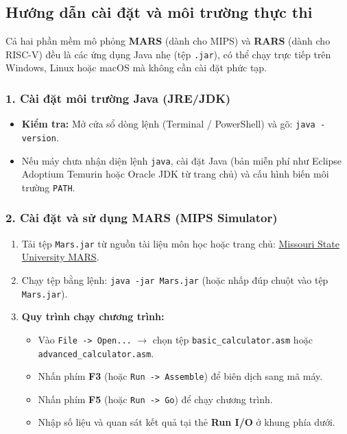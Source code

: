 \documentclass[12pt,a4paper]{article}
\begin{document}
\subsection{Hướng dẫn cài đặt và môi trường thực thi}
Cả hai phần mềm mô phỏng \textbf{MARS} (dành cho MIPS) và \textbf{RARS} (dành cho RISC-V) đều là các ứng dụng Java nhẹ (tệp \texttt{.jar}), có thể chạy trực tiếp trên Windows, Linux hoặc macOS mà không cần cài đặt phức tạp.

\subsubsection{1. Cài đặt môi trường Java (JRE/JDK)}
\begin{itemize}
    \item \textbf{Kiểm tra:} Mở cửa sổ dòng lệnh (Terminal / PowerShell) và gõ: \texttt{java -version}.
    \item Nếu máy chưa nhận diện lệnh \texttt{java}, cài đặt Java (bản miễn phí như Eclipse Adoptium Temurin hoặc Oracle JDK từ trang chủ) và cấu hình biến môi trường \texttt{PATH}.
\end{itemize}

\subsubsection{2. Cài đặt và sử dụng MARS (MIPS Simulator)}
\begin{enumerate}
    \item Tải tệp \texttt{Mars.jar} từ nguồn tài liệu môn học hoặc trang chủ: \href{https://courses.missouristate.edu/KenVollmar/mars/}{Missouri State University MARS}.
    \item Chạy tệp bằng lệnh: \texttt{java -jar Mars.jar} (hoặc nhấp đúp chuột vào tệp \texttt{Mars.jar}).
    \item \textbf{Quy trình chạy chương trình:}
    \begin{itemize}
        \item Vào \texttt{File -> Open...} $\rightarrow$ chọn tệp \texttt{basic\_calculator.asm} hoặc \texttt{advanced\_calculator.asm}.
        \item Nhấn phím \textbf{F3} (hoặc \texttt{Run -> Assemble}) để biên dịch sang mã máy.
        \item Nhấn phím \textbf{F5} (hoặc \texttt{Run -> Go}) để chạy chương trình.
        \item Nhập số liệu và quan sát kết quả tại thẻ \textbf{Run I/O} ở khung phía dưới.
    \end{itemize}
\end{enumerate}
\end{document}
